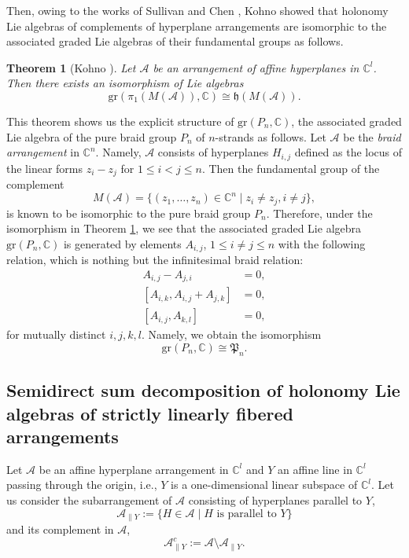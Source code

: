 \documentclass[a4paper,12pt]{article}
\newcommand{\C}{\mathbb{C}}
\newtheorem{thm}{Theorem}[section]
\theoremstyle{definition}
\theoremstyle{remark}
\begin{document}
Then, owing to the works of Sullivan \cite{Sul77} and Chen \cite{Ch73}, 
Kohno showed that holonomy Lie algebras of complements of hyperplane arrangements are isomorphic to the associated graded Lie algebras of their fundamental groups as follows. 
\begin{thm}[Kohno \cite{Koh83}]\label{kohnochen}
Let $\mathcal{A}$ be an arrangement of affine hyperplanes 
in $\mathbb{C}^{l}$. Then there exists an isomorphism of Lie algebras 
\[
	\mathrm{gr}(\pi_{1}(M(\mathcal{A})),\mathbb{C})\cong \mathfrak{h}(M(\mathcal{A})).
\]
\end{thm}

This theorem shows us the explicit structure of 
$\mathrm{gr}(P_{n},\mathbb{C})$, the associated graded 
Lie algebra of the pure braid group $P_{n}$ of $n$-strands as follows.
Let $\mathcal{A}$ be the \emph{braid arrangement}
in $\mathbb{C}^{n}$. Namely, $\mathcal{A}$
consists of hyperplanes 
$H_{i,j}$ defined as the 
locus of the linear forms $z_{i}-z_{j}$
for $1\le i<j\le n$. 
Then the fundamental group of the complement 
\[
	M(\mathcal{A})=\{(z_{1},\ldots,z_{n})\in \mathbb{C}^{n}\mid z_{i}\neq z_{j}, i\neq j\},
\]
is known to be isomorphic to the 
pure braid group $P_{n}$.
Therefore, under the isomorphism in Theorem \ref{kohnochen},
we see that the associated graded Lie algebra 
$\mathrm{gr}(P_{n},\mathbb{C})$ is generated by 
elements $A_{i,j}$, $1\le i\neq j\le n$ with the following relation, 
which is nothing but the infinitesimal braid relation:
\begin{align*}
	A_{i,j}-A_{j,i}&=0, \\
	[A_{i,k},A_{i,j}+A_{j,k}]&=0,\\
	[A_{i,j},A_{k,l}]&=0, 
\end{align*}
for mutually distinct $i,j,k,l$.
Namely, we obtain the isomorphism
\[
	\mathrm{gr}(P_{n},\mathbb{C})\cong \mathfrak{P}_{n}.
\]

\subsection{Semidirect sum decomposition of holonomy Lie algebras of strictly linearly fibered arrangements}\label{sec:CCX}
Let $\mathcal{A}$ be an 
affine hyperplane arrangement in $\C^{l}$ and
$Y$ an affine line in $\C^{l}$ 
passing through the origin, i.e.,
$Y$ is a one-dimensional linear subspace of $\C^{l}$.
Let us consider the subarrangement of $\mathcal{A}$ consisting of hyperplanes parallel to $Y$,
\[
	\mathcal{A}_{\parallel Y}:=\{H\in \mathcal{A}\mid H\text{ is parallel to }Y\}
\] 
and its complement in $\mathcal{A}$,
\[
	\mathcal{A}_{\parallel Y}^{c}:=\mathcal{A}\setminus \mathcal{A}_{\parallel Y}.
\]
\end{document}
